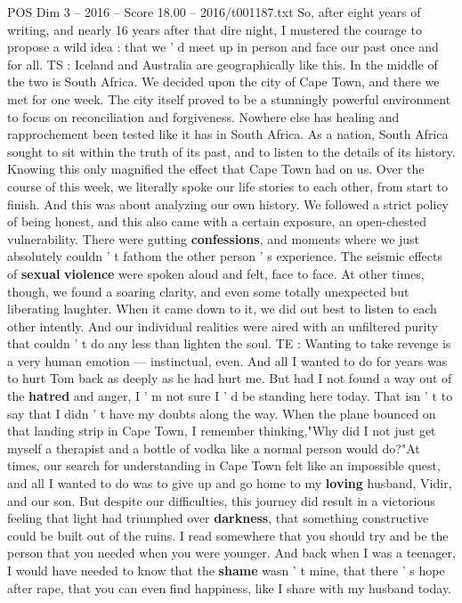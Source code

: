 \begin{textsample}{POS Dim 3 – 2016 – Score 18.00 – 2016/t001187.txt}
So, after eight years of writing, and nearly 16 years after that dire night, I mustered the courage to propose a wild idea : that we ' d meet up in person and face our past once and for all.
TS : Iceland and Australia are geographically like this.
In the middle of the two is South Africa.
We decided upon the city of Cape Town, and there we met for one week.
The city itself proved to be a stunningly powerful environment to focus on reconciliation and forgiveness.
Nowhere else has healing and rapprochement been tested like it has in South Africa.
As a nation, South Africa sought to sit within the truth of its past, and to listen to the details of its history.
Knowing this only magnified the effect that Cape Town had on us.
Over the course of this week, we literally spoke our life stories to each other, from start to finish.
And this was about analyzing our own history.
We followed a strict policy of being honest, and this also came with a certain exposure, an open-chested vulnerability.
There were gutting \textbf{confessions}, and moments where we just absolutely couldn ' t fathom the other person ' s experience.
The seismic effects of \textbf{sexual} \textbf{violence} were spoken aloud and felt, face to face.
At other times, though, we found a soaring clarity, and even some totally unexpected but liberating laughter.
When it came down to it, we did out best to listen to each other intently.
And our individual realities were aired with an unfiltered purity that couldn ' t do any less than lighten the soul.
TE : Wanting to take revenge is a very human emotion — instinctual, even.
And all I wanted to do for years was to hurt Tom back as deeply as he had hurt me.
But had I not found a way out of the \textbf{hatred} and anger, I ' m not sure I ' d be standing here today.
That isn ' t to say that I didn ' t have my doubts along the way.
When the plane bounced on that landing strip in Cape Town, I remember thinking,"Why did I not just get myself a therapist and a bottle of vodka like a normal person would do?"At times, our search for understanding in Cape Town felt like an impossible quest, and all I wanted to do was to give up and go home to my \textbf{loving} husband, Vidir, and our son.
But despite our difficulties, this journey did result in a victorious feeling that light had triumphed over \textbf{darkness}, that something constructive could be built out of the ruins.
I read somewhere that you should try and be the person that you needed when you were younger.
And back when I was a teenager, I would have needed to know that the \textbf{shame} wasn ' t mine, that there ' s hope after rape, that you can even find happiness, like I share with my husband today.

\end{textsample}
